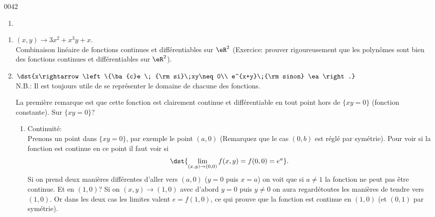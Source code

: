 \begin{corrige}{0042}
\begin{alternative}
\begin{enumerate}
\item

\end{enumerate}
\end{alternative}


\begin{alternative}
	
\begin{enumerate}
\item $(x,y)\rightarrow  3x^2+x^3y+x$.\\
Combinaison linéaire de fonctions continues et différentiables sur $\eR^2$ (Exercice: prouver rigoureusement que les polyn\^{o}mes sont bien des fonctions continues et différentiables sur $\eR^2$).

\item  $\dst{x\rightarrow \left\{\ba{c}e \; {\rm si}\;xy\neq0\\
              			        e^{x+y}\;{\rm sinon} \ea\right.}$\\
N.B.: Il est toujours utile de se représenter le domaine de chacune des fonctions. 

\noindent La première remarque est que cette fonction est clairement continue et différentiable en tout point hors de $\{xy=0\}$ (fonction constante). Sur $\{xy=0\}$?
\begin{enumerate}
\item Continuité:\\
Prenons un point dans $\{xy=0\}$, par exemple le point $(a,0)$ (Remarquez que le cas $(0,b)$ est réglé par symétrie). Pour voir si la fonction est continue en ce point il faut voir si \[\dst{\lim_{(x,y)\rightarrow (0,0)}f(x,y)=f(0,0)=e^a}.\] Si on prend deux manières différentes d'aller vers $(a,0)$ ($y=0$ puis $x=a$) on voit que si $a \neq1$ la fonction ne peut pas \^{e}tre continue. Et en $(1,0)$? Si on $(x,y)\rightarrow (1,0)$ avec d'abord $y=0$ puis $y\neq0$ on aura regardétoutes les manières de tendre vers $(1,0)$. Or dans les deux cas les limites valent $e = f(1,0)$, ce qui prouve que la fonction est continue en $(1,0)$ (et $(0,1)$ par symétrie).


\end{enumerate}
\end{enumerate}
\end{alternative}
\end{corrige}

